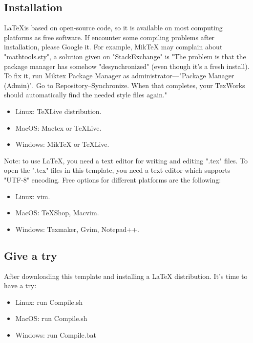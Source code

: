 \subsection{Installation} %
\LaTeX is based on open-source code, so it is available on most computing platforms as free software. If encounter some compiling problems after installation, please Google it. For example, MikTeX may complain about "mathtools.sty", a solution given on "StackExchange" is "The problem is that the package manager has somehow "desynchronized" (even though it's a fresh install). To fix it, run Miktex Package Manager as administrator---"Package Manager (Admin)". Go to Repository--Synchronize. When that completes, your TexWorks should automatically find the needed style files again."
\begin{itemize}
    \item Linux: TeXLive distribution. 
    \item MacOS: Mactex or TeXLive.
    \item Windows: MikTeX or TeXLive. 
\end{itemize}

Note: to use \LaTeX{}, you need a text editor for writing and editing ".tex" files. To open the ".tex" files in this template, you need a text editor which supports "UTF-8" encoding. Free options for different platforms are the following:
\begin{itemize}
    \item Linux: vim. 
    \item MacOS: TeXShop, Macvim.
    \item Windows: Texmaker, Gvim, Notepad++. 
\end{itemize}

\subsection{Give a try} %
After downloading this template and installing a \LaTeX{} distribution. It's time to have a try:
\begin{itemize}
    \item Linux: run Compile.sh
    \item MacOS: run Compile.sh
    \item Windows: run Compile.bat
\end{itemize}


